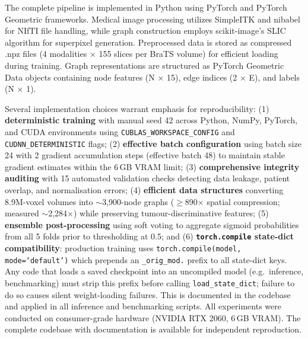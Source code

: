 \documentclass{article}
\begin{document}
The complete pipeline is implemented in Python using PyTorch and PyTorch Geometric \cite{fey2019pyg} frameworks. Medical image processing utilizes SimpleITK and nibabel for NIfTI file handling, while graph construction employs scikit-image's SLIC algorithm for superpixel generation. Preprocessed data is stored as compressed .npz files (4 modalities $\times$ 155 slices per BraTS volume) for efficient loading during training. Graph representations are structured as PyTorch Geometric Data objects containing node features (N $\times$ 15), edge indices (2 $\times$ E), and labels (N $\times$ 1).

Several implementation choices warrant emphasis for reproducibility: (1) \textbf{deterministic training} with manual seed 42 across Python, NumPy, PyTorch, and CUDA environments using \texttt{CUBLAS\_WORKSPACE\_CONFIG} and \texttt{CUDNN\_DETERMINISTIC} flags; (2) \textbf{effective batch configuration} using batch size 24 with 2 gradient accumulation steps (effective batch 48) to maintain stable gradient estimates within the 6\,GB VRAM limit; (3) \textbf{comprehensive integrity auditing} with 15 automated validation checks detecting data leakage, patient overlap, and normalisation errors; (4) \textbf{efficient data structures} converting 8.9M-voxel volumes into $\sim$3,900-node graphs ($\geq$890$\times$ spatial compression; measured $\sim$2,284$\times$) while preserving tumour-discriminative features; (5) \textbf{ensemble post-processing} using soft voting to aggregate sigmoid probabilities from all 5 folds prior to thresholding at 0.5; and (6) \textbf{\texttt{torch.compile} state-dict compatibility}: production training uses \texttt{torch.compile(model, mode=`default')} which prepends an \texttt{\_orig\_mod.} prefix to all state-dict keys. Any code that loads a saved checkpoint into an uncompiled model (e.g.\ inference, benchmarking) must strip this prefix before calling \texttt{load\_state\_dict}; failure to do so causes silent weight-loading failures. This is documented in the codebase and applied in all inference and benchmarking scripts. All experiments were conducted on consumer-grade hardware (NVIDIA RTX 2060, 6\,GB VRAM). The complete codebase with documentation is available for independent reproduction.

\vspace{5mm}
\end{document}
